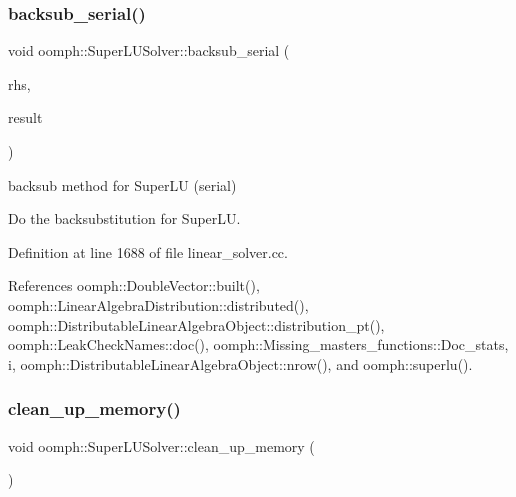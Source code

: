 \mbox{\label{classoomph_1_1SuperLUSolver_a3cf319015c149958fd68cfb631e6b2e9}} 
\subsubsection{\texorpdfstring{backsub\+\_\+serial()}{backsub\_serial()}}
{\footnotesize\ttfamily void oomph\+::\+Super\+L\+U\+Solver\+::backsub\+\_\+serial (\begin{DoxyParamCaption}\item[{const \hyperlink{classoomph_1_1DoubleVector}{Double\+Vector} \&}]{rhs,  }\item[{\hyperlink{classoomph_1_1DoubleVector}{Double\+Vector} \&}]{result }\end{DoxyParamCaption})\hspace{0.3cm}{\ttfamily [private]}}



backsub method for Super\+LU (serial) 

Do the backsubstitution for Super\+LU. 

Definition at line 1688 of file linear\+\_\+solver.\+cc.



References oomph\+::\+Double\+Vector\+::built(), oomph\+::\+Linear\+Algebra\+Distribution\+::distributed(), oomph\+::\+Distributable\+Linear\+Algebra\+Object\+::distribution\+\_\+pt(), oomph\+::\+Leak\+Check\+Names\+::doc(), oomph\+::\+Missing\+\_\+masters\+\_\+functions\+::\+Doc\+\_\+stats, i, oomph\+::\+Distributable\+Linear\+Algebra\+Object\+::nrow(), and oomph\+::superlu().

\mbox{\label{classoomph_1_1SuperLUSolver_aec78b96a8f831a89f9b8fb48b1ce0c68}} 
\subsubsection{\texorpdfstring{clean\+\_\+up\+\_\+memory()}{clean\_up\_memory()}}
{\footnotesize\ttfamily void oomph\+::\+Super\+L\+U\+Solver\+::clean\+\_\+up\+\_\+memory (\begin{DoxyParamCaption}{ }\end{DoxyParamCaption})\hspace{0.3cm}{\ttfamily [virtual]}}



